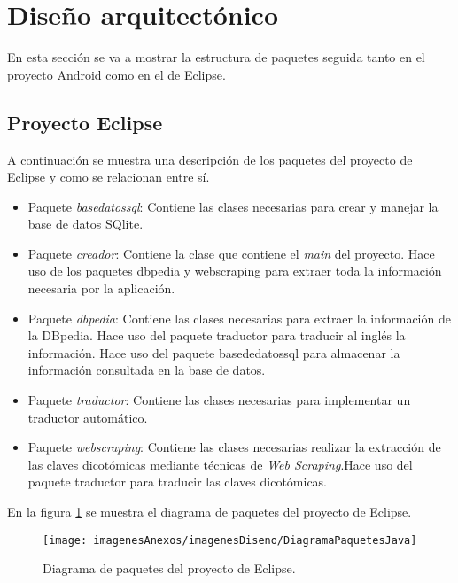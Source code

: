 \section{Diseño arquitectónico}

En esta sección se va a mostrar la estructura de paquetes seguida tanto en el proyecto Android como en el de Eclipse.

\subsection{Proyecto Eclipse}

A continuación se muestra una descripción de los paquetes del proyecto de Eclipse y como se relacionan entre sí.

\begin{itemize}
	\item Paquete \textit{basedatossql}: Contiene las clases necesarias para crear y manejar la base de datos SQlite.
	\item Paquete \textit{creador}: Contiene la clase que contiene el \textit{main} del proyecto. Hace uso de los paquetes dbpedia y webscraping para extraer toda la información necesaria por la aplicación.
	\item Paquete \textit{dbpedia}: Contiene las clases necesarias para extraer la información de la DBpedia. Hace uso del paquete traductor para traducir al inglés la información. Hace uso del paquete basededatossql para almacenar la información consultada en la base de datos.
	\item Paquete \textit{traductor}: Contiene las clases necesarias para implementar un traductor automático.
	\item Paquete \textit{webscraping}: Contiene las clases necesarias realizar la extracción de las claves dicotómicas mediante técnicas de \textit{Web Scraping}.Hace uso del paquete traductor para traducir las claves dicotómicas.
\end{itemize}

En la figura \ref{figDiagramaPaquetesJava} se muestra el diagrama de paquetes del proyecto de Eclipse.

\begin{figure}[h]
    \begin{center}%
        \begin{center}%
          \texttt{[image: imagenesAnexos/imagenesDiseno/DiagramaPaquetesJava]}%
          \caption{Diagrama de paquetes del proyecto de Eclipse.}%
          \label{figDiagramaPaquetesJava}%
        \end{center}%
  	\end{center}%
\end{figure}%

